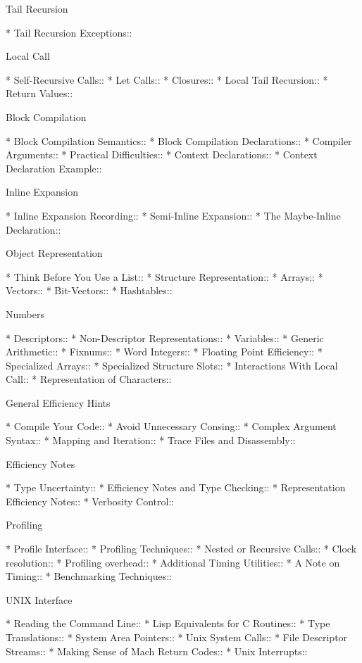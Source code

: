 \begin{menu}
Tail Recursion

* Tail Recursion Exceptions::   

Local Call

* Self-Recursive Calls::        
* Let Calls::                   
* Closures::                    
* Local Tail Recursion::        
* Return Values::               

Block Compilation

* Block Compilation Semantics::  
* Block Compilation Declarations::  
* Compiler Arguments::          
* Practical Difficulties::      
* Context Declarations::        
* Context Declaration Example::  

Inline Expansion

* Inline Expansion Recording::  
* Semi-Inline Expansion::       
* The Maybe-Inline Declaration::  

Object Representation

* Think Before You Use a List::  
* Structure Representation::
* Arrays::                      
* Vectors::                     
* Bit-Vectors::                 
* Hashtables::                  

Numbers

* Descriptors::                 
* Non-Descriptor Representations::  
* Variables::                   
* Generic Arithmetic::          
* Fixnums::                     
* Word Integers::               
* Floating Point Efficiency::   
* Specialized Arrays::          
* Specialized Structure Slots::  
* Interactions With Local Call::  
* Representation of Characters::  

General Efficiency Hints

* Compile Your Code::           
* Avoid Unnecessary Consing::   
* Complex Argument Syntax::     
* Mapping and Iteration::       
* Trace Files and Disassembly::  

Efficiency Notes

* Type Uncertainty::            
* Efficiency Notes and Type Checking::  
* Representation Efficiency Notes::  
* Verbosity Control::           

Profiling

* Profile Interface::           
* Profiling Techniques::        
* Nested or Recursive Calls::   
* Clock resolution::            
* Profiling overhead::          
* Additional Timing Utilities::  
* A Note on Timing::            
* Benchmarking Techniques::     

UNIX Interface

* Reading the Command Line::    
* Lisp Equivalents for C Routines::  
* Type Translations::           
* System Area Pointers::        
* Unix System Calls::           
* File Descriptor Streams::     
* Making Sense of Mach Return Codes::  
* Unix Interrupts::             


\end{menu}
